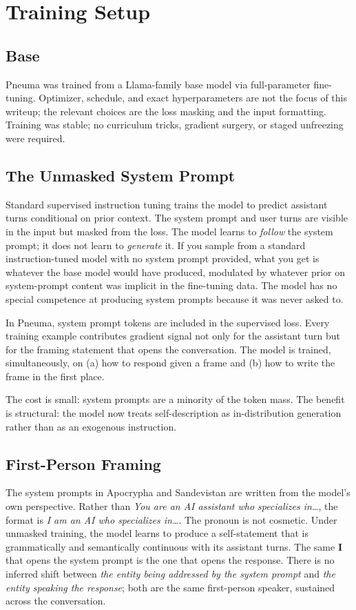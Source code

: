 \documentclass[11pt,letterpaper]{article}
\begin{document}
\section{Training Setup}

\subsection{Base}

Pneuma was trained from a Llama-family base model via full-parameter fine-tuning. Optimizer, schedule, and exact hyperparameters are not the focus of this writeup; the relevant choices are the loss masking and the input formatting. Training was stable; no curriculum tricks, gradient surgery, or staged unfreezing were required.

\subsection{The Unmasked System Prompt}

Standard supervised instruction tuning trains the model to predict assistant turns conditional on prior context. The system prompt and user turns are visible in the input but masked from the loss. The model learns to \textit{follow} the system prompt; it does not learn to \textit{generate} it. If you sample from a standard instruction-tuned model with no system prompt provided, what you get is whatever the base model would have produced, modulated by whatever prior on system-prompt content was implicit in the fine-tuning data. The model has no special competence at producing system prompts because it was never asked to.

In Pneuma, system prompt tokens are included in the supervised loss. Every training example contributes gradient signal not only for the assistant turn but for the framing statement that opens the conversation. The model is trained, simultaneously, on (a) how to respond given a frame and (b) how to write the frame in the first place.

The cost is small: system prompts are a minority of the token mass. The benefit is structural: the model now treats self-description as in-distribution generation rather than as an exogenous instruction.

\subsection{First-Person Framing}

The system prompts in Apocrypha and Sandevistan are written from the model's own perspective. Rather than \textit{You are an AI assistant who specializes in\dots}, the format is \textit{I am an AI who specializes in\dots}. The pronoun is not cosmetic. Under unmasked training, the model learns to produce a self-statement that is grammatically and semantically continuous with its assistant turns. The same \textbf{I} that opens the system prompt is the one that opens the response. There is no inferred shift between \textit{the entity being addressed by the system prompt} and \textit{the entity speaking the response}; both are the same first-person speaker, sustained across the conversation.
\end{document}
